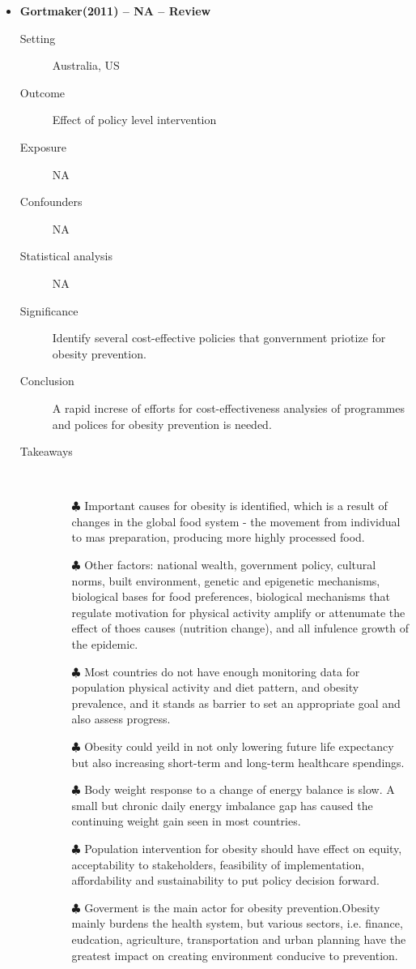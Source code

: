 \documentclass{article}
\begin{document}
\begin{itemize}
\item{\bf Gortmaker(2011) -- NA  -- Review} 
		\begin{description}
			\item[Setting] Australia, US 
			\item[Outcome] Effect of policy level intervention 
			\item[Exposure] NA
			\item[Confounders] NA
			\item[Statistical analysis] NA
			\item[Significance] Identify several cost-effective policies that gonvernment priotize for obesity prevention. 
			\item[Conclusion] A rapid increse of efforts for cost-effectiveness analysies of programmes and polices for obesity prevention is needed. 
			\item[Takeaways] \mbox{}\\
				\begin{itemize}
					\item[$\clubsuit$] Important causes for obesity is identified, which is a result of changes in the global food system - the movement from individual to mas preparation, producing more highly processed food.   
					\item[$\clubsuit$] Other factors: national wealth, government policy, cultural norms, built environment, genetic and epigenetic mechanisms, biological bases for food preferences, biological mechanisms that regulate motivation for physical activity amplify or attenumate the effect of thoes causes (nutrition change), and all infulence growth of the epidemic. 
					\item[$\clubsuit$] Most countries do not have enough monitoring data for population physical activity and diet pattern, and obesity prevalence, and it stands as barrier to set an appropriate goal and also assess progress. 
					\item[$\clubsuit$] Obesity could yeild in not only lowering future life expectancy but also increasing short-term and long-term healthcare spendings.
					\item[$\clubsuit$] Body weight response to a change of energy balance is slow. A small but chronic daily energy imbalance gap has caused the continuing weight gain seen in most countries.
					\item[$\clubsuit$] Population intervention for obesity should have effect on equity, acceptability to stakeholders, feasibility of implementation, affordability and sustainability to put policy decision forward. 
					\item[$\clubsuit$] Goverment is the main actor for obesity prevention.Obesity mainly burdens the health system, but various sectors, i.e. finance, eudcation, agriculture, transportation and urban planning have the greatest impact on creating environment conducive to prevention. 

				\end{itemize} 
			
		\end{description}




\end{itemize}
\end{document}
